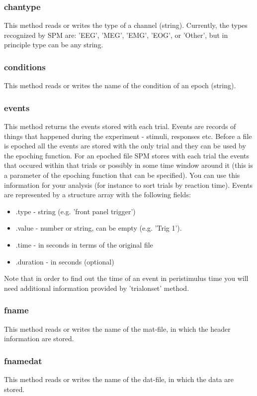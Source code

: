 \subsubsection{chantype}
This method reads or writes the type of a channel (string). Currently,
the types recognized by SPM are: 'EEG', 'MEG', 'EMG', 'EOG', or
'Other', but in principle type can be any string.

\subsubsection{conditions}
This method  reads or writes the name of the condition of an epoch
(string). 

\subsubsection{events}
This method returns the events stored with each trial. Events are records
of things that happened during the experiment - stimuli, responses etc.
Before a file is epoched all the events are stored with the only trial and they 
can be used by the epoching function. For an epoched file SPM stores with each trial
the events that occured within that trials or possibly in some time window around it
(this is a parameter of the epoching function that can be specified). You can use this
information for your analysis (for instance to sort trials by reaction time). Events
are represented by a structure array with the following fields:

\begin{itemize}
\item .type - string (e.g. 'front panel trigger')
\item .value - number or string, can be empty (e.g. 'Trig 1').
\item .time - in seconds in terms of the original file
\item .duration - in seconds (optional)
\end{itemize}

Note that in order to find out the time of an event in peristimulus time
you will need additional information provided by 'trialonset' method.

\subsubsection{fname}
This method reads or writes the name of the mat-file, in which the
header information are stored. 

\subsubsection{fnamedat}
This method reads or writes the name of the dat-file, in which the
data are stored. 

